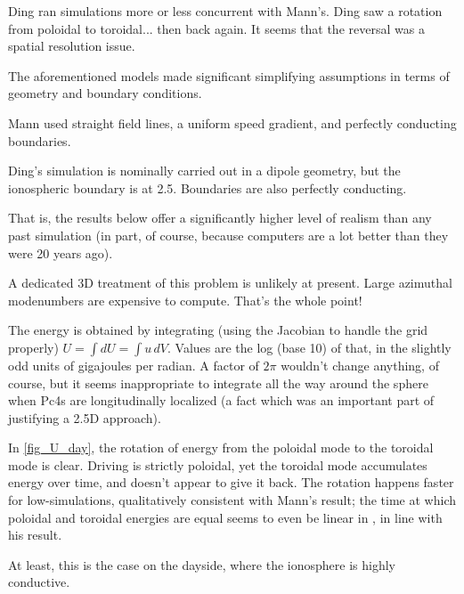 Ding\cite{ding_1995} ran simulations more or less concurrent with Mann's. Ding saw a rotation from poloidal to toroidal... then back again. It seems that the reversal was a spatial resolution issue. 

The aforementioned models made significant simplifying assumptions in terms of geometry and boundary conditions. 

Mann used straight field lines, a uniform \Alfven speed gradient, and perfectly conducting boundaries. 

Ding's simulation is nominally carried out in a dipole geometry, but the ionospheric boundary is at \SI{2.5}{\RE}. Boundaries are also perfectly conducting. 

That is, the results below offer a significantly higher level of realism than any past simulation (in part, of course, because computers are a lot better than they were 20 years ago). 

A dedicated 3D treatment of this problem is unlikely at present. Large azimuthal modenumbers are expensive to compute. That's the whole point! 

The energy is obtained by integrating (using the Jacobian to handle the grid properly) $U = \int dU = \int u \, dV$. Values are the log (base 10) of that, in the slightly odd units of gigajoules per radian. A factor of $2\pi$ wouldn't change anything, of course, but it seems inappropriate to integrate all the way around the sphere when Pc4s are longitudinally localized (a fact which was an important part of justifying a 2.5D approach). 




In \cref{fig_U_day}, the rotation of energy from the poloidal mode to the toroidal mode is clear. Driving is strictly poloidal, yet the toroidal mode accumulates energy over time, and doesn't appear to give it back. The rotation happens faster for low-\azm simulations, qualitatively consistent with Mann's result; the time at which poloidal and toroidal energies are equal seems to even be linear in \azm, in line with his result. 

At least, this is the case on the dayside, where the ionosphere is highly conductive. 

